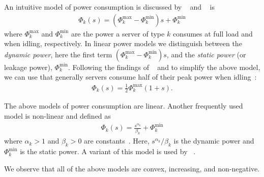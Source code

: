 An intuitive model of power consumption is discussed by \citeauthor{Dayarathna2016}~\cite{Dayarathna2016} and \citeauthor{Ismail2020}~\cite{Ismail2020} is \begin{align}\label{eq:energy_model:1}
    \Phi_k(s) = (\Phi_k^{\text{max}} - \Phi_k^{\text{min}})s + \Phi_k^{\text{min}}
\end{align} where $\Phi_k^{\text{max}}$ and $\Phi_k^{\text{min}}$ are the power a server of type $k$ consumes at full load and when idling, respectively. In linear power models we distinguish between the \emph{dynamic power}, here the first term $(\Phi_k^{\text{max}} - \Phi_k^{\text{min}})s$, and the \emph{static power} (or leakage power), $\Phi_k^{\text{min}}$. Following the findings of \citeauthor{Barroso2007}~\cite{Barroso2007} and to simplify the above model, we can use that generally servers consume half of their peak power when idling~\cite{Ismail2020}: \begin{align}\label{eq:energy_model:2}
    \Phi_k(s) = \frac{1}{2} \Phi_k^{\text{max}} (1 + s).
\end{align}

The above models of power consumption are linear. Another frequently used model is non-linear and defined as \begin{align}\label{eq:energy_model:3}
    \Phi_k(s) = \frac{s^{\alpha_k}}{\beta_k} + \Phi_k^{\text{min}}
\end{align} where $\alpha_k > 1$ and $\beta_k > 0$ are constants~\cite{Dayarathna2016}. Here, $s^{\alpha_k}/\beta_k$ is the dynamic power and $\Phi_k^{\text{min}}$ is the static power. A variant of this model is used by \citeauthor{Bansal2015}~\cite{Bansal2015}.

We observe that all of the above models are convex, increasing, and non-negative.

